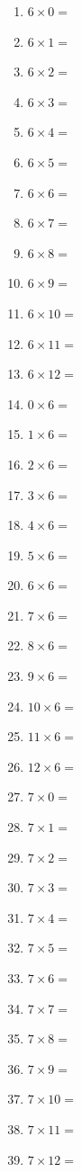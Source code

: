 \documentclass{article}
\begin{document}
\begin{multicols}{4}
\begin{enumerate}
\item $6 \times 0 =$
\item $6 \times 1 =$
\item $6 \times 2 =$
\item $6 \times 3 =$
\item $6 \times 4 =$
\item $6 \times 5 =$
\item $6 \times 6 =$
\item $6 \times 7 =$
\item $6 \times 8 =$
\item $6 \times 9 =$
\item $6 \times 10 =$
\item $6 \times 11 =$
\item $6 \times 12 =$

\item $0 \times 6 =$
\item $1 \times 6 =$
\item $2 \times 6 =$
\item $3 \times 6 =$
\item $4 \times 6 =$
\item $5 \times 6 =$
\item $6 \times 6 =$
\item $7 \times 6 =$
\item $8 \times 6 =$
\item $9 \times 6 =$
\item $10 \times 6 =$
\item $11 \times 6 =$
\item $12 \times 6 =$

\item $7 \times 0 =$
\item $7 \times 1 =$
\item $7 \times 2 =$
\item $7 \times 3 =$
\item $7 \times 4 =$
\item $7 \times 5 =$
\item $7 \times 6 =$
\item $7 \times 7 =$
\item $7 \times 8 =$
\item $7 \times 9 =$
\item $7 \times 10 =$
\item $7 \times 11 =$
\item $7 \times 12 =$


\end{enumerate}
\end{multicols}
\end{document}
